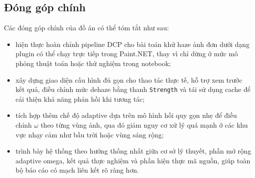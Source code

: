 \subsection{Đóng góp chính}

Các đóng góp chính của đồ án có thể tóm tắt như sau:
\begin{itemize}
\item hiện thực hoàn chỉnh pipeline DCP cho bài toán khử haze ảnh đơn dưới dạng plugin có thể chạy trực tiếp trong Paint.NET, thay vì chỉ dừng ở mức mô phỏng thuật toán hoặc thử nghiệm trong notebook;
\item xây dựng giao diện cấu hình đủ gọn cho thao tác thực tế, hỗ trợ xem trước kết quả, điều chỉnh mức dehaze bằng thanh \texttt{Strength} và tái sử dụng cache để cải thiện khả năng phản hồi khi tương tác;
\item tích hợp thêm chế độ adaptive dựa trên mô hình hồi quy gọn nhẹ để điều chỉnh \(\omega\) theo từng vùng ảnh, qua đó giảm nguy cơ xử lý quá mạnh ở các khu vực nhạy cảm như bầu trời hoặc vùng sáng rộng;
\item trình bày hệ thống theo hướng thống nhất giữa cơ sở lý thuyết, phần mở rộng adaptive omega, kết quả thực nghiệm và phần hiện thực mã nguồn, giúp toàn bộ báo cáo có mạch liên kết rõ ràng hơn.
\end{itemize}
